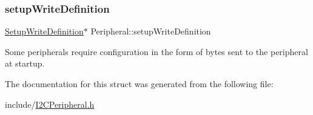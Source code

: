 \mbox{\label{struct_peripheral_ab2a550bc5d7e03dcba843bf6f6367e12}} 
\subsubsection{\texorpdfstring{setup\+Write\+Definition}{setupWriteDefinition}}
{\footnotesize\ttfamily \mbox{\hyperlink{struct_setup_write_definition}{Setup\+Write\+Definition}}$\ast$ Peripheral\+::setup\+Write\+Definition}

Some peripherals require configuration in the form of bytes sent to the peripheral at startup. 

The documentation for this struct was generated from the following file\+:\begin{DoxyCompactItemize}
\item 
include/\mbox{\hyperlink{_i2_c_peripheral_8h}{I2\+C\+Peripheral.\+h}}\end{DoxyCompactItemize}
